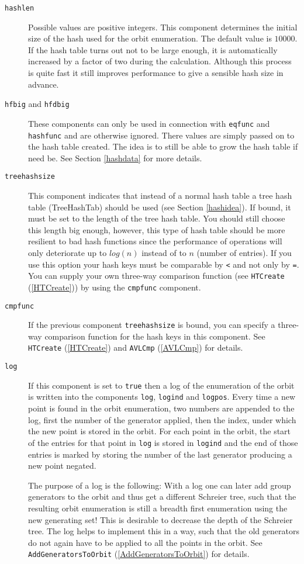 \documentclass[a4paper,11pt]{report}
\begin{document}
{{{\begin{description}
\item[{\texttt{hashlen}}] Possible values are positive integers. This component determines the initial
size of the hash used for the orbit enumeration. The default value is $10000$. If the hash table turns out not to be large enough, it is automatically
increased by a factor of two during the calculation. Although this process is
quite fast it still improves performance to give a sensible hash size in
advance. 
\item[{\texttt{hfbig} and \texttt{hfdbig}}] These components can only be used in connection with \texttt{eqfunc} and \texttt{hashfunc} and are otherwise ignored. There values are simply passed on to the hash table
created. The idea is to still be able to grow the hash table if need be. See
Section \ref{hashdata} for more details. 
\item[{\texttt{treehashsize}}] This component indicates that instead of a normal hash table a tree hash table
(TreeHashTab) should be used (see Section \ref{hashidea}). If bound, it must be set to the length of the tree hash table. You should
still choose this length big enough, however, this type of hash table should
be more resilient to bad hash functions since the performance of operations
will only deteriorate up to $log(n)$ instead of to $n$ (number of entries). If you use this option your hash keys must be comparable
by \texttt{{\textless}} and not only by \texttt{=}. You can supply your own three-way comparison function (see \texttt{HTCreate} (\ref{HTCreate})) by using the \texttt{cmpfunc} component. 
\item[{\texttt{cmpfunc}}] If the previous component \texttt{treehashsize} is bound, you can specify a three-way comparison function for the hash keys in
this component. See \texttt{HTCreate} (\ref{HTCreate}) and \texttt{AVLCmp} (\ref{AVLCmp}) for details. 
\item[{\texttt{log}}] If this component is set to \texttt{true} then a log of the enumeration of the orbit is written into the components \texttt{log}, \texttt{logind} and \texttt{logpos}. Every time a new point is found in the orbit enumeration, two numbers are
appended to the log, first the number of the generator applied, then the
index, under which the new point is stored in the orbit. For each point in the
orbit, the start of the entries for that point in \texttt{log} is stored in \texttt{logind} and the end of those entries is marked by storing the number of the last
generator producing a new point negated.

 The purpose of a log is the following: With a log one can later add group
generators to the orbit and thus get a different Schreier tree, such that the
resulting orbit enumeration is still a breadth first enumeration using the new
generating set! This is desirable to decrease the depth of the Schreier tree.
The log helps to implement this in a way, such that the old generators do not
again have to be applied to all the points in the orbit. See \texttt{AddGeneratorsToOrbit} (\ref{AddGeneratorsToOrbit}) for details.


\end{description}}}}
\end{document}

